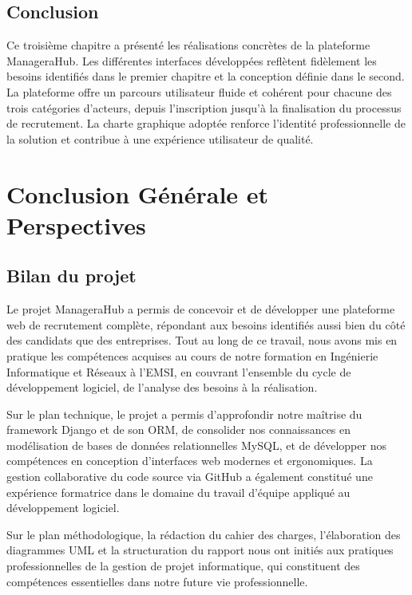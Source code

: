 \documentclass[12pt,a4paper]{report}
\begin{document}
\section*{Conclusion}

Ce troisième chapitre a présenté les réalisations concrètes de la plateforme ManageraHub. Les différentes interfaces développées reflètent fidèlement les besoins identifiés dans le premier chapitre et la conception définie dans le second. La plateforme offre un parcours utilisateur fluide et cohérent pour chacune des trois catégories d'acteurs, depuis l'inscription jusqu'à la finalisation du processus de recrutement. La charte graphique adoptée renforce l'identité professionnelle de la solution et contribue à une expérience utilisateur de qualité.

\chapter*{Conclusion Générale et Perspectives}

\section*{Bilan du projet}

Le projet ManageraHub a permis de concevoir et de développer une plateforme web de recrutement complète, répondant aux besoins identifiés aussi bien du côté des candidats que des entreprises. Tout au long de ce travail, nous avons mis en pratique les compétences acquises au cours de notre formation en Ingénierie Informatique et Réseaux à l'EMSI, en couvrant l'ensemble du cycle de développement logiciel, de l'analyse des besoins à la réalisation.

Sur le plan technique, le projet a permis d'approfondir notre maîtrise du framework Django et de son ORM, de consolider nos connaissances en modélisation de bases de données relationnelles MySQL, et de développer nos compétences en conception d'interfaces web modernes et ergonomiques. La gestion collaborative du code source via GitHub a également constitué une expérience formatrice dans le domaine du travail d'équipe appliqué au développement logiciel.

Sur le plan méthodologique, la rédaction du cahier des charges, l'élaboration des diagrammes UML et la structuration du rapport nous ont initiés aux pratiques professionnelles de la gestion de projet informatique, qui constituent des compétences essentielles dans notre future vie professionnelle.
\end{document}
